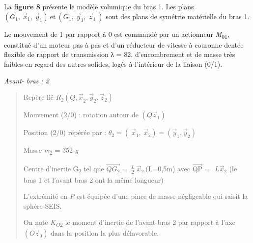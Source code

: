 \documentclass[]{article}
\begin{document}
La \textbf{figure 8} présente le modèle volumique du bras 1. Les plans
\(\left( G_{1},\ {\overrightarrow{x}}_{1},\ {\overrightarrow{y}}_{1} \right)\ \text{et}\ \left( G_{1},\ {\overrightarrow{y}}_{1},\ {\overrightarrow{z}}_{1}\  \right)\)
sont des plans de symétrie matérielle du bras 1.

Le mouvement de 1 par rapport à 0 est commandé par un actionneur
\emph{M}\textsubscript{01}, constitué d'un moteur pas à pas et d'un
réducteur de vitesse à couronne dentée flexible de rapport de
transmission λ = 82, d'encombrement et de masse très faibles en regard
des autres solides, logés à l'intérieur de la liaison (0/1).

\emph{Avant- bras : 2}

\begin{quote}
Repère lié
\(R_{2}({Q,\overrightarrow{x}}_{2},{\overrightarrow{y}}_{2},{\overrightarrow{z}}_{2})\ \ \)

Mouvement (2/0) : rotation autour de
\(\left( Q{\overrightarrow{z}}_{1} \right)\)

Position (2/0) repérée par :
\(\theta_{2} = (\ {\overrightarrow{x}}_{1},\ {\overrightarrow{x}}_{2}) = ({\overrightarrow{y}}_{1},{\overrightarrow{y}}_{2})\)

Masse \emph{m}\textsubscript{2} = 352 \emph{g }

Centre d'inertie G\textsubscript{2} tel que
\(\overrightarrow{QG_{2}} = \ \frac{L}{2}\ {\overrightarrow{x}}_{2}\ \)(L=0,5m)
avec \(\overrightarrow{\text{QP}} = \ \ {L\overrightarrow{x}}_{2}\) (le
bras 1 et l'avant bras 2 ont la même longueur)

L'extrémité en \emph{P} est équipée d'une pince de masse négligeable qui
saisit la sphère SEIS.

On note \emph{K\textsubscript{O}}\textsubscript{2} le moment d'inertie
de l'avant-bras 2 par rapport à l'axe
\(\left( O{\overrightarrow{z}}_{0} \right)\) dans la position la plus
défavorable.
\end{quote}

\protect\hypertarget{page6}{}{}
\end{document}
